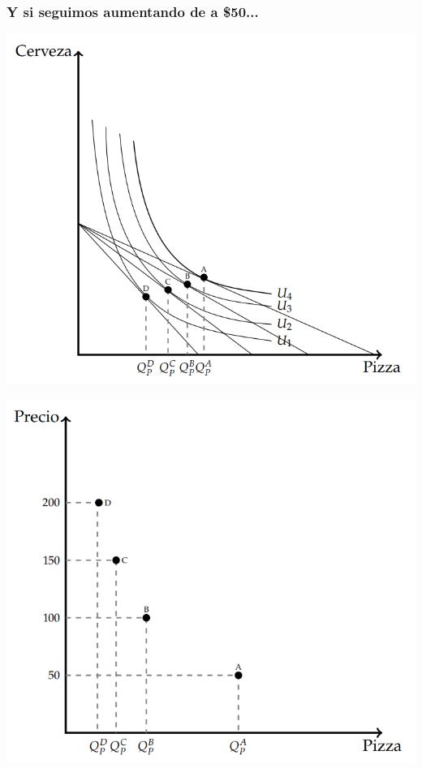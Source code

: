 \documentclass{beamer}
\begin{document}
\begin{frame}
\frametitle{Y si seguimos aumentando de a \$50...}
\begin{center}
  \begin{minipage}{0.48\textwidth}
      \includegraphics[width=\linewidth]{../Figures/C8.15.png}
  \end{minipage}\hfill
  \begin{minipage}{0.48\textwidth}
      \includegraphics[width=\linewidth]{../Figures/C8.16.png}
  \end{minipage}
\end{center}
\end{frame}
\end{document}
